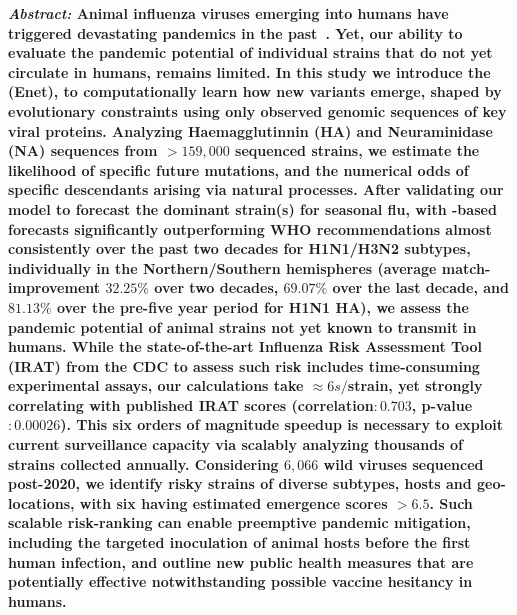 \documentclass[onecolumn, compsoc,10pt]{IEEEtran}
\begin{document}
  
\maketitle  

{\bf \sffamily \fontsize{10}{12}\selectfont \noindent   
  {\normalfont \itshape Abstract:} Animal influenza  viruses emerging into humans %
  have triggered devastating  pandemics in the past~\cite{shao2017evolution,mills2004transmissibility,reid2003origin,landolt2007up}. Yet, our ability to evaluate the pandemic potential of individual strains that do not yet circulate in humans, remains limited. In this study we introduce the \enet (Enet), to computationally learn how new variants emerge, shaped by evolutionary constraints using only observed genomic sequences  of key viral proteins. Analyzing Haemagglutinnin (HA) and Neuraminidase (NA) sequences from $>159,000$ sequenced strains, we estimate the likelihood of specific future mutations, and the numerical odds of  specific descendants arising via natural processes. After validating our model to forecast the dominant strain(s) for seasonal flu, with \enet-based forecasts significantly outperforming WHO recommendations almost consistently over the past two decades for H1N1/H3N2 subtypes, individually in the Northern/Southern hemispheres (average match-improvement $32.25\% $ over two decades, $69.07\%$ over the last decade, and $81.13\%$ over the pre-\cov five year period for H1N1 HA), we assess the pandemic potential of animal strains not yet known to transmit in humans. While the state-of-the-art Influenza Risk Assessment Tool (IRAT) from the CDC to assess such risk includes time-consuming experimental assays, our calculations take $\approx 6s/$strain, yet strongly correlating with published IRAT scores (correlation$: 0.703$, p-value$: 0.00026$). This six orders of magnitude speedup is  necessary to exploit  current surveillance capacity via scalably analyzing thousands of strains collected annually. Considering $6,066$ wild \infl viruses sequenced post-2020, we identify risky strains of diverse subtypes, hosts and geo-locations, with six having estimated emergence scores $> 6.5$. Such scalable risk-ranking can enable preemptive pandemic mitigation, including the targeted inoculation of animal hosts before the first human infection, and outline new public health measures that are potentially effective notwithstanding possible vaccine hesitancy in humans.}
  
\vspace{10pt} 
\end{document}

